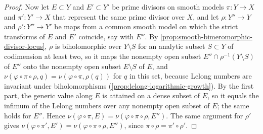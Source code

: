 \begin{proof}
Now let $E\subset Y$ and $E'\subset Y'$ be prime divisors on smooth models $\pi\colon Y\to X$ and $\pi'\colon Y'\to X$ that represent the same prime divisor over $X$, and let $\rho\colon Y''\to Y$ and $\rho'\colon Y''\to Y'$ be maps from a common smooth model on which the strict transforms of $E$ and $E'$ coincide, say with $E''$. By \cref{prop:smooth-bimeromorphic-divisor-locus}, $\rho$ is biholomorphic over $Y\setminus S$ for an analytic subset $S\subset Y$ of codimension at least two, so it maps the nonempty open subset $E''\cap\rho^{-1}(Y\setminus S)$ of $E''$ onto the nonempty open subset $E\setminus S$ of $E$, and $\nu(\varphi\circ\pi\circ\rho,q)=\nu(\varphi\circ\pi,\rho(q))$ for $q$ in this set, because Lelong numbers are invariant under biholomorphisms (\cref{prop:lelong-logarithmic-growth}). By the first part, the generic value along $E$ is attained on a dense subset of $E$, so it equals the infimum of the Lelong numbers over any nonempty open subset of $E$; the same holds for $E''$. Hence $\nu(\varphi\circ\pi,E)=\nu(\varphi\circ\pi\circ\rho,E'')$. The same argument for $\rho'$ gives $\nu(\varphi\circ\pi',E')=\nu(\varphi\circ\pi\circ\rho,E'')$, since $\pi\circ\rho=\pi'\circ\rho'$.
\end{proof}

